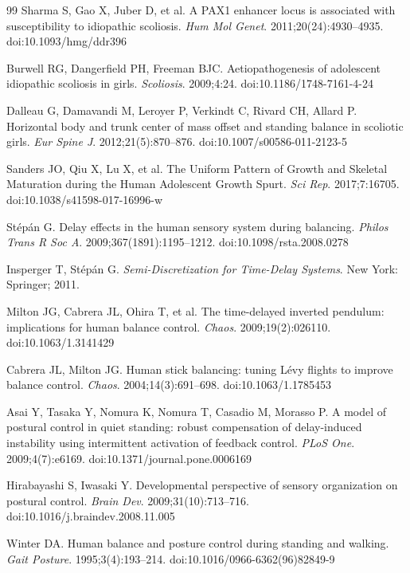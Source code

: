 \documentclass[12pt,a4paper]{article}
\begin{document}
\begin{thebibliography}{99}
Sharma S, Gao X, Juber D, et al.
A PAX1 enhancer locus is associated with susceptibility to idiopathic scoliosis.
\textit{Hum Mol Genet}. 2011;20(24):4930--4935.
doi:10.1093/hmg/ddr396

Burwell RG, Dangerfield PH, Freeman BJC.
Aetiopathogenesis of adolescent idiopathic scoliosis in girls.
\textit{Scoliosis}. 2009;4:24.
doi:10.1186/1748-7161-4-24

Dalleau G, Damavandi M, Leroyer P, Verkindt C, Rivard CH, Allard P.
Horizontal body and trunk center of mass offset and standing balance in scoliotic girls.
\textit{Eur Spine J}. 2012;21(5):870--876.
doi:10.1007/s00586-011-2123-5

Sanders JO, Qiu X, Lu X, et al.
The Uniform Pattern of Growth and Skeletal Maturation during the Human Adolescent Growth Spurt.
\textit{Sci Rep}. 2017;7:16705.
doi:10.1038/s41598-017-16996-w

St\'ep\'an G.
Delay effects in the human sensory system during balancing.
\textit{Philos Trans R Soc A}. 2009;367(1891):1195--1212.
doi:10.1098/rsta.2008.0278

Insperger T, St\'ep\'an G.
\textit{Semi-Discretization for Time-Delay Systems}. New York: Springer; 2011.

Milton JG, Cabrera JL, Ohira T, et al.
The time-delayed inverted pendulum: implications for human balance control.
\textit{Chaos}. 2009;19(2):026110.
doi:10.1063/1.3141429

Cabrera JL, Milton JG.
Human stick balancing: tuning L\'evy flights to improve balance control.
\textit{Chaos}. 2004;14(3):691--698.
doi:10.1063/1.1785453

Asai Y, Tasaka Y, Nomura K, Nomura T, Casadio M, Morasso P.
A model of postural control in quiet standing: robust compensation of delay-induced instability using intermittent activation of feedback control.
\textit{PLoS One}. 2009;4(7):e6169.
doi:10.1371/journal.pone.0006169

Hirabayashi S, Iwasaki Y.
Developmental perspective of sensory organization on postural control.
\textit{Brain Dev}. 2009;31(10):713--716.
doi:10.1016/j.braindev.2008.11.005

Winter DA.
Human balance and posture control during standing and walking.
\textit{Gait Posture}. 1995;3(4):193--214.
doi:10.1016/0966-6362(96)82849-9


\end{thebibliography}
\end{document}

